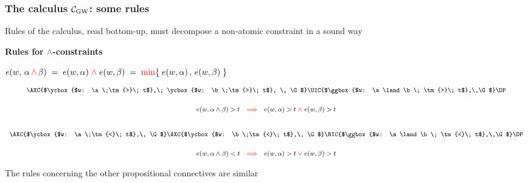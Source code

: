 \begin{frame}
  \frametitle{The calculus $\mathcal{C}_{\mathrm{GW}}$: some rules}


  Rules of the calculus, read bottom-up, must decompose a non-atomic constraint in a sound way

  \medskip
  {\blue\bf Rules for $\land$-constraints}

   \begin{tcolorbox}[colframe=blue!75!black,width=33em]
      \center
$e(w,\, \alpha \,{\color{red} \land}\, \beta)\;=\; e(w,\alpha)\;{\color{red} \land}\;e(w,\beta)\;=\;{\color{red} \min}\{\; e(w,\alpha)\,,\,e(w,\beta)    \;\}$
\end{tcolorbox}   
    
  
  \[\small
    \begin{array}{c}
      \small
    \AXC{$\ycbox{$w: \a \;\tm{>}\; t$},\;  \ycbox{$w: \b \;\tm{>}\; t$},   \, \G$}   
    \RightLabel{$\tr{\land >}$}
    \UIC{$\ggbox{$w: \a\land \b\; \tm{>}\; t$},\,\G$}
    \DP
      \\[4ex]
    e(w,\a \land \b) > t \quad\tr{\Implies}\quad  e(w,\a) > t\;\tr{\land }\;  e(w,\b) > t
      \\[6ex]
    \AXC{$\ycbox{$w: \a \;\tm{<}\; t$},\, \G$}   
    \AXC{$\ycbox{$w: \b \;\tm{<}\; t$},\, \G$}
    \RightLabel{$\tr{\land <}$}
    \BIC{$\ggbox{$w: \a\land \b\; \tm{<}\; t$},\,\G$}
      \DP
        \\[4ex]
    e(w,\a \land \b) < t \quad\tr{\Implies}\quad  e(w,\a) > t\;\tr{\lor }\;  e(w,\b) > t
      \end{array}
    \]

    \smallskip
    The rules concerning the other propositional connectives are similar 
\end{frame}  


